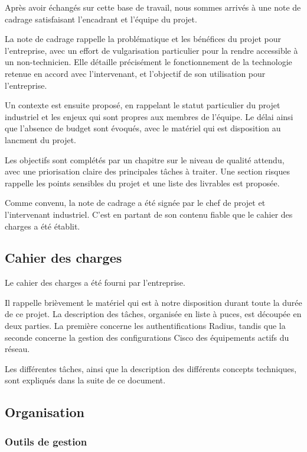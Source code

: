 Après avoir échangés sur cette base de travail, nous sommes arrivés à une note de cadrage satisfaisant l'encadrant et l'équipe du projet.

La note de cadrage rappelle la problématique et les bénéfices du projet pour l'entreprise, avec un effort de vulgarisation particulier pour la rendre accessible à un non-technicien. Elle détaille précisément le fonctionnement de la technologie retenue en accord avec l'intervenant, et l'objectif de son utilisation pour l'entreprise. 

Un contexte est ensuite proposé, en rappelant le statut particulier du projet industriel et les enjeux qui sont propres aux membres de l'équipe. Le délai ainsi que l'absence de budget sont évoqués, avec le matériel qui est disposition au lancment du projet.

Les objectifs sont complétés par un chapitre sur le niveau de qualité attendu, avec une priorisation claire des principales tâches à traiter. Une section risques rappelle les points sensibles du projet et une liste des livrables est proposée.

Comme convenu, la note de cadrage a été signée par le chef de projet et l'intervenant industriel. C'est en partant de son contenu fiable que le cahier des charges a été établit.

\subsection{Cahier des charges}

Le cahier des charges a été fourni par l'entreprise.

Il rappelle brièvement le matériel qui est à notre disposition durant toute la durée de ce projet. La description des tâches, organisée en liste à puces, est découpée en deux parties. La première concerne les authentifications Radius, tandis que la seconde concerne la gestion des configurations Cisco des équipements actifs du réseau.

Les différentes tâches, ainsi que la description des différents concepts techniques, sont expliqués dans la suite de ce document.

\subsection{Organisation}
\subsubsection{Outils de gestion}

